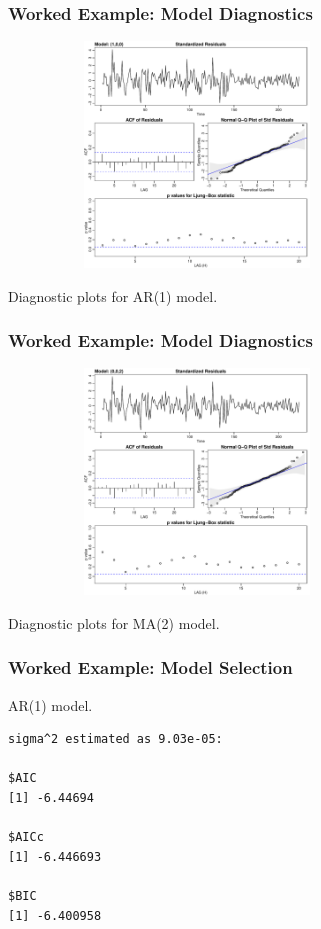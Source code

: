 \documentclass[%
xcolor=pdftex]{beamer}
\begin{document}
\begin{frame}
\frametitle{Worked Example: Model Diagnostics}

\includegraphics[width=100mm, height=60mm]{ar_diag.pdf}

Diagnostic plots for AR(1) model.

\end{frame}

\begin{frame}
\frametitle{Worked Example: Model Diagnostics}

\includegraphics[width=100mm, height=60mm]{ma_diag.pdf}

Diagnostic plots for MA(2) model.

\end{frame}

\begin{frame}[fragile]
\frametitle{Worked Example: Model Selection}

AR(1) model.

\begin{verbatim}
sigma^2 estimated as 9.03e-05:

$AIC
[1] -6.44694

$AICc
[1] -6.446693

$BIC
[1] -6.400958
\end{verbatim}

\end{frame}
\end{document}
